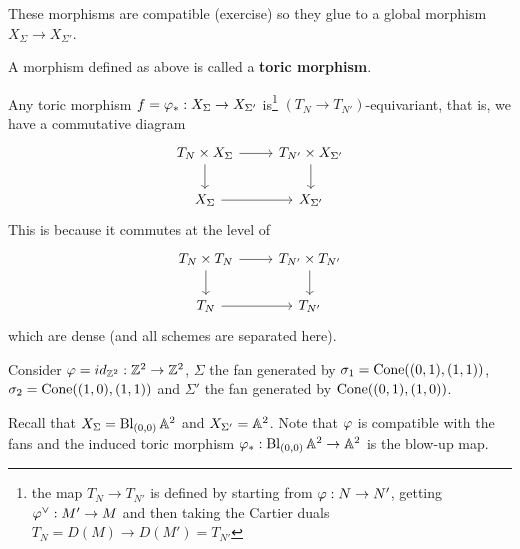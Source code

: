 These morphisms are compatible (exercise) so they glue to a global morphism $X_\Sigma\to X_{\Sigma'}$.


\begin{definition}[]
A morphism defined as above is called a \textbf{toric morphism}.
\end{definition}


\begin{remark}
Any toric morphism $f=\varphi_\ast:X_\Sigma\to X_{\Sigma'}$ is\footnote{the map $T_N\to T_{N'}$ is defined by starting from $\varphi:N\to N'$, getting $\varphi^\vee:M'\to M$ and then taking the Cartier duals $T_N=D(M)\to D(M')=T_{N'}$} $(T_N\to T_{N'})$-equivariant, that is, we have a commutative diagram
\[\begin{tikzcd}
	{T_N\times X_{\Sigma}} & {T_{N'}\times X_{\Sigma'}} \\
	{X_\Sigma} & {X_{\Sigma'}}
	\arrow[from=1-1, to=1-2]
	\arrow[from=1-1, to=2-1]
	\arrow[from=1-2, to=2-2]
	\arrow[from=2-1, to=2-2]
\end{tikzcd}\]
This is because it commutes at the level of
\[\begin{tikzcd}
	{T_N\times T_{N}} & {T_{N'}\times T_{N'}} \\
	{T_N} & {T_{N'}}
	\arrow[from=1-1, to=1-2]
	\arrow[from=1-1, to=2-1]
	\arrow[from=1-2, to=2-2]
	\arrow[from=2-1, to=2-2]
\end{tikzcd}\]
which are dense (and all schemes are separated here).
\end{remark}


\begin{example}
Consider $\varphi=id_{\mathbb{Z}^2}:\mathbb{Z}^2\to \mathbb{Z}^2$, $\Sigma$ the fan generated by $\sigma_1=\operatorname{Cone}((0,1),(1,1))$, $\sigma_2=\operatorname{Cone}((1,0),(1,1))$ and $\Sigma'$ the fan generated by $\operatorname{Cone}((0,1),(1,0))$.

Recall that $X_\Sigma=\operatorname{Bl}_{(0,0)}\mathbb{A}^2$ and $X_{\Sigma'}=\mathbb{A}^2$. Note that $\varphi$ is compatible with the fans and the induced toric morphism $\varphi_\ast:\operatorname{Bl}_{(0,0)}\mathbb{A}^2\to \mathbb{A}^2$ is the blow-up map.
\end{example}



